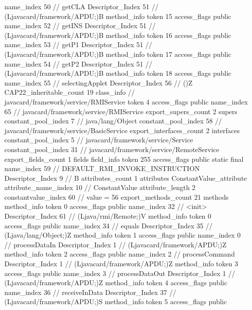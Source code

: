{{{{{					name_index	50		// getCLA
					Descriptor_Index	51		// (Ljavacard/framework/APDU;)B
				}
				method_info {
					token	15
					access_flags	public
					name_index	52		// getINS
					Descriptor_Index	51		// (Ljavacard/framework/APDU;)B
				}
				method_info {
					token	16
					access_flags	public
					name_index	53		// getP1
					Descriptor_Index	51		// (Ljavacard/framework/APDU;)B
				}
				method_info {
					token	17
					access_flags	public
					name_index	54		// getP2
					Descriptor_Index	51		// (Ljavacard/framework/APDU;)B
				}
				method_info {
					token	18
					access_flags	public
					name_index	55		// selectingApplet
					Descriptor_Index	56		// ()Z
				}
			}
			CAP22_inheritable_count	19
		}
		class_info {		// javacard/framework/service/RMIService
			token	4
			access_flags	public
			name_index	65		// javacard/framework/service/RMIService
			export_supers_count	2
			supers {
				constant_pool_index	7		// java/lang/Object
				constant_pool_index	58		// javacard/framework/service/BasicService
			}
			export_interfaces_count	2
			interfaces {
				constant_pool_index	5		// javacard/framework/service/Service
				constant_pool_index	31		// javacard/framework/service/RemoteService
			}
			export_fields_count	1
			fields {
			field_info {
				token	255
				access_flags	public static final
				name_index	59		// DEFAULT_RMI_INVOKE_INSTRUCTION
				Descriptor_Index	9		// B
				attributes_count	1
				attributes {
				ConstantValue_attribute {
					attribute_name_index	10		// ConstantValue
					attribute_length	2
					constantvalue_index	60		// value = 56
				}
				}
			}
			}
			export_methods_count	21
			methods {
				method_info {
					token	0
					access_flags	public
					name_index	32		// <init>
					Descriptor_Index	61		// (Ljava/rmi/Remote;)V
				}
				method_info {
					token	0
					access_flags	public
					name_index	34		// equals
					Descriptor_Index	35		// (Ljava/lang/Object;)Z
				}
				method_info {
					token	1
					access_flags	public
					name_index	0		// processDataIn
					Descriptor_Index	1		// (Ljavacard/framework/APDU;)Z
				}
				method_info {
					token	2
					access_flags	public
					name_index	2		// processCommand
					Descriptor_Index	1		// (Ljavacard/framework/APDU;)Z
				}
				method_info {
					token	3
					access_flags	public
					name_index	3		// processDataOut
					Descriptor_Index	1		// (Ljavacard/framework/APDU;)Z
				}
				method_info {
					token	4
					access_flags	public
					name_index	36		// receiveInData
					Descriptor_Index	37		// (Ljavacard/framework/APDU;)S
				}
				method_info {
					token	5
					access_flags	public
}}}}}
